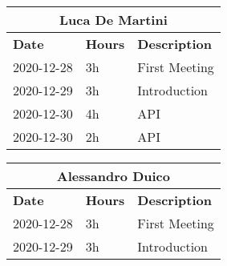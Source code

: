 
\begin{table}[H]
    \centering
    \begin{tabular}{|l|l|l|}
        \multicolumn{3}{c}{\textbf{Luca De Martini}}                   \\
        \hline
        \textbf{Date} & \textbf{Hours} & \textbf{Description}          \\\hline
        2020-12-28    & 3h             & First Meeting       \\\hline
        2020-12-29    & 3h             & Introduction       \\\hline
        2020-12-30    & 4h             & API       \\\hline
        2020-12-30    & 2h             & API       \\\hline
    \end{tabular}
\end{table}
\begin{table}[H]
    \centering
    \begin{tabular}{|l|l|l|}
        \multicolumn{3}{c}{\textbf{Alessandro Duico}}                      \\
        \hline
        \textbf{Date} & \textbf{Hours} & \textbf{Description}              \\\hline
        2020-12-28    & 3h             & First Meeting           \\\hline
        2020-12-29    & 3h             & Introduction       \\\hline
    \end{tabular}
\end{table}
